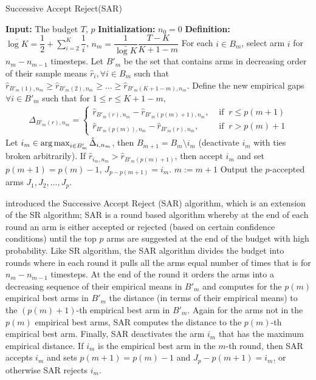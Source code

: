 \begin{algorithm}[!th]
\caption{Successive Accept Reject(SAR)}
\label{alg:sar}
\begin{algorithmic}[1]
\State \textbf{Input: } The budget $T$, $p$ 
\State \textbf{Initialization: } $n_0 = 0$
\State \textbf{Definition: } $\overline{\log K} = \dfrac{1}{2} + \sum_{i=2}^{K}\dfrac{1}{i}$, $n_m = \dfrac{1}{\bar{\log K}}\dfrac{T-K}{K + 1 - m}$
\State For each $i \in B_{m}$, select arm $i$ for $n_m - n_{m-1}$ timesteps.
\State Let $B'_{m}$ be the set that contains arms in decreasing order of their sample means $\hat{r}_{i},\forall i\in B_{m}$ such that $\hat{r}_{B'_{m}(1),n_m} \geq \hat{r}_{B'_{m}(2),n_m} \geq \ldots \geq \hat{r}_{B'_{m}(K+1-m),n_m}$.
\State Define the new empirical gaps $\forall i\in B'_{m}$ such that for $1\leq r\leq K+1-m$,
\begin{align*}
\Delta_{B'_{m}(r),n_m} =
    \begin{cases}
      \hat{r}_{B'_{m}(r),n_m} - \hat{r}_{B'_{m}(p(m)+1),n_m}, & \text{ if }\ r\leq p(m+1) \\
      \hat{r}_{B'_{m}(p(m)),n_m}  - \hat{r}_{B'_{m}(r),n_m}, & \text{ if }\ r> p(m)+1
    \end{cases}
\end{align*}
\State Let $i_m\in \operatorname*{arg\,max}_{i\in B'_m} \hat{\Delta}_{i,n_m}$, then $B_{m+1} = B_m\setminus i_m$ (deactivate $i_m$ with ties broken arbitrarily).
\State If $\hat{r}_{i_m,n_m} > \hat{r}_{B'_{m}(p(m)+1)}$, then accept $i_m$ and set $p(m+1)=p(m)-1$, $J_{p - p(m+1)}=i_m$.
\State $m:=m+1 $
\EndFor
\State Output the $p$-accepted arms $J_1,J_2,\ldots, J_p$.
\end{algorithmic}
\end{algorithm}

\citet{bubeck2013multiple} introduced the  Successive Accept Reject (SAR) algorithm, which is an extension of the SR algorithm; SAR is a round based algorithm whereby at the end of each round an arm is either accepted or rejected (based on certain confidence conditions) until the top $p$ arms are suggested at the end of the budget with high probability. Like SR algorithm, the SAR algorithm divides the budget into rounds where in each round it pulls all the arms equal number of times that is for $n_m - n_{m-1}$ timesteps. At the end of the round it orders the arms into a decreasing sequence of their empirical means in $B'_{m}$ and computes for the $p(m)$ empirical best arms in $B'_{m}$ the distance (in terms of their empirical means) to the $(p(m) + 1)$-th empirical best arm in $B'_{m}$. Again for the arms not in the $p(m)$ empirical best arms, SAR computes the distance to the $p(m)$-th empirical best arm. Finally, SAR deactivates the arm $i_m$ that has the maximum empirical distance. If $i_m$ is the empirical best arm in the $m$-th round, then SAR accepts $i_m$ and sets $p(m + 1) = p(m) - 1$ and $J_p - p(m+1) = i_m$, or otherwise SAR rejects  $i_m$. 

